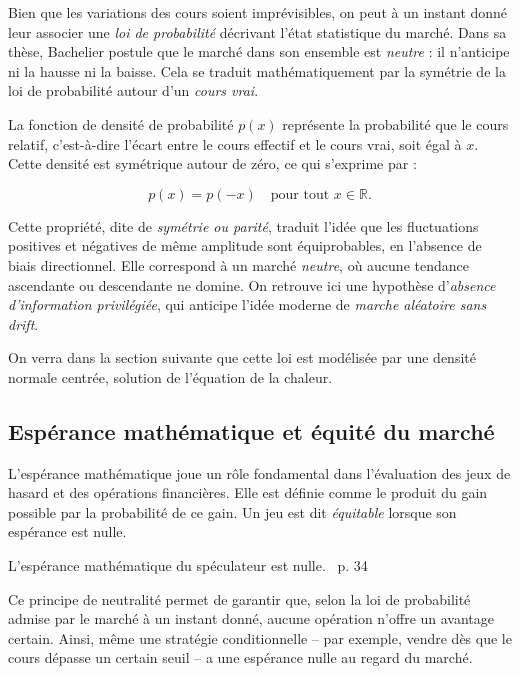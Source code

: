 \documentclass[12pt,a4paper]{article}
\begin{document}
Bien que les variations des cours soient imprévisibles, on peut à un instant donné leur associer une \textit{loi de probabilité} décrivant l’état statistique du marché. Dans sa thèse, Bachelier postule que le marché dans son ensemble est \textit{neutre} : il n’anticipe ni la hausse ni la baisse. Cela se traduit mathématiquement par la symétrie de la loi de probabilité autour d’un \textit{cours vrai}.

La fonction de densité de probabilité \( p(x) \) représente la probabilité que le cours relatif, c’est-à-dire l’écart entre le cours effectif et le cours vrai, soit égal à \( x \). Cette densité est symétrique autour de zéro, ce qui s’exprime par :

\[
p(x) = p(-x) \quad \text{pour tout } x \in \mathbb{R}.
\]

Cette propriété, dite de \textit{symétrie ou parité}, traduit l’idée que les fluctuations positives et négatives de même amplitude sont équiprobables, en l’absence de biais directionnel. Elle correspond à un marché \textit{neutre}, où aucune tendance ascendante ou descendante ne domine. On retrouve ici une hypothèse d’\textit{absence d’information privilégiée}, qui anticipe l’idée moderne de \emph{marche aléatoire sans drift}.

On verra dans la section suivante que cette loi est modélisée par une densité normale centrée, solution de l'équation de la chaleur.\\

\subsection{Espérance mathématique et équité du marché}

L’espérance mathématique joue un rôle fondamental dans l’évaluation des jeux de hasard et des opérations financières. Elle est définie comme le produit du gain possible par la probabilité de ce gain. Un jeu est dit \textit{équitable} lorsque son espérance est nulle.

\begin{center}
    \og L’espérance mathématique du spéculateur est nulle. \fg\ p. 34
\end{center}

Ce principe de neutralité permet de garantir que, selon la loi de probabilité admise par le marché à un instant donné, aucune opération n’offre un avantage certain. Ainsi, même une stratégie conditionnelle -- par exemple, vendre dès que le cours dépasse un certain seuil -- a une espérance nulle au regard du marché.
\end{document}
